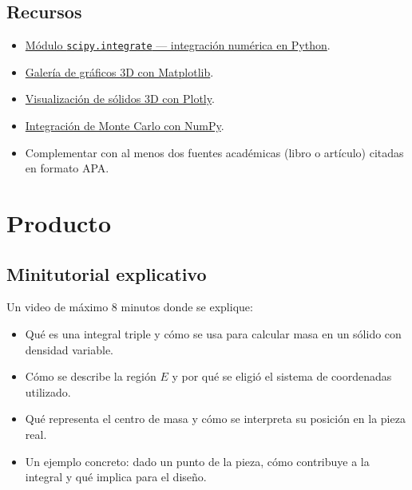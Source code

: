 \documentclass[a4,11pt]{aleph-notas}
\begin{document}
\subsection*{Recursos}
\begin{itemize}[leftmargin=*]
    \item \href{https://docs.scipy.org/doc/scipy/reference/integrate.html}{Módulo \texttt{scipy.integrate} — integración numérica en Python}.
    \item \href{https://matplotlib.org/stable/gallery/mplot3d/index.html}{Galería de gráficos 3D con Matplotlib}.
    \item \href{https://plotly.com/python/3d-mesh/}{Visualización de sólidos 3D con Plotly}.
    \item \href{https://numpy.org/doc/stable/reference/random/generated/numpy.random.uniform.html}{Integración de Monte Carlo con NumPy}.
    \item Complementar con al menos dos fuentes académicas (libro o artículo) citadas en formato APA.
\end{itemize}


\section{Producto}

\subsection{Minitutorial explicativo}
Un video de máximo 8 minutos donde se explique:
\begin{itemize}[leftmargin=*]
    \item Qué es una integral triple y cómo se usa para calcular masa en un sólido con densidad variable.
    \item Cómo se describe la región $E$ y por qué se eligió el sistema de coordenadas utilizado.
    \item Qué representa el centro de masa y cómo se interpreta su posición en la pieza real.
    \item Un ejemplo concreto: dado un punto de la pieza, cómo contribuye a la integral y qué implica para el diseño.
\end{itemize}
\end{document}
